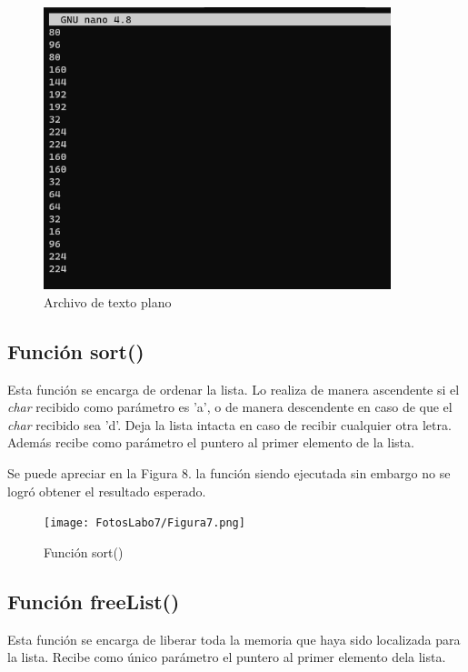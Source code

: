 \documentclass[12pt,a4paper]{article}
\begin{document}
\begin{figure}[H]
    \centering
    \center
    \includegraphics[width=0.9\textwidth]{FotosLabo7/Figura 6.png}
    \caption{Archivo de texto plano \cite{cap}}
    \label{fig:push_front}
\end{figure}

\subsection{Función sort()}

Esta función se encarga de ordenar la lista. Lo realiza de manera ascendente si el \textit{char} recibido como parámetro es ’a’, o de manera descendente en caso de que el \textit{char} recibido sea ’d’. Deja la lista intacta en caso de recibir cualquier otra letra. Además recibe como parámetro el puntero al primer elemento de la lista.

Se puede apreciar en la Figura 8. la función siendo ejecutada sin embargo no se logró obtener el resultado esperado.

\begin{figure}[H]
    \centering
    \center
    \texttt{[image: FotosLabo7/Figura7.png]}
    \caption{Función sort() \cite{cap}}
    \label{fig:push_front}
\end{figure}

\subsection{Función freeList()}

Esta función se encarga de liberar toda la memoria que haya sido localizada para la lista. Recibe como único parámetro el puntero al primer elemento dela lista.
\end{document}
